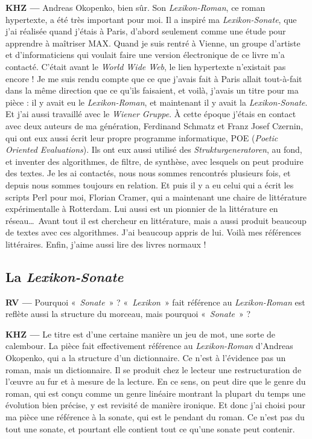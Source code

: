 \documentclass[a4paper,12pt]{article}
\newcommand{\guill}[1]{«~#1~»}
\begin{document}
\textbf{KHZ ---} Andreas Okopenko, bien sûr. Son \emph{Lexikon-Roman}, ce roman hypertexte, a été très important pour moi. Il a inspiré ma \emph{Lexikon-Sonate}, que j'ai réalisée quand j'étais à Paris, d'abord seulement comme une étude pour apprendre à maîtriser MAX. Quand je suis rentré à Vienne, un groupe d'artiste et d'informaticiens qui voulait faire une version électronique de ce livre m'a contacté. C'était avant le \emph{World Wide Web}, le lien hypertexte n'existait pas encore ! Je me suis rendu compte que ce que j'avais fait à Paris allait tout-à-fait dans la même direction que ce qu'ils faisaient, et voilà, j'avais un titre pour ma pièce : il y avait eu le \emph{Lexikon-Roman}, et maintenant il y avait la \emph{Lexikon-Sonate}. Et j'ai aussi travaillé avec le \emph{Wiener Gruppe}. À cette époque j'étais en contact avec deux auteurs de ma génération, Ferdinand Schmatz et Franz Josef Czernin, qui ont eux aussi écrit leur propre programme informatique, POE (\emph{Poetic Oriented Evaluations}). Ils ont eux aussi utilisé des \emph{Strukturgeneratoren}, au fond, et inventer des algorithmes, de filtre, de synthèse, avec lesquels on peut produire des textes. Je les ai contactés, nous nous sommes rencontrés plusieurs fois, et depuis nous sommes toujours en relation. Et puis il y a eu celui qui a écrit les scripts Perl pour moi, Florian Cramer, qui a maintenant une chaire de littérature expérimentalle à Rotterdam. Lui aussi est un pionnier de la littérature en réseau\dots~Avant tout il est chercheur en littérature, mais a aussi produit beaucoup de textes avec ces algorithmes. J'ai beaucoup appris de lui. Voilà mes références littéraires. Enfin, j'aime aussi lire des livres normaux !

\subsection{La \emph{Lexikon-Sonate}}

\textbf{RV ---} Pourquoi \guill{\emph{Sonate}} ? \guill{\emph{Lexikon}} fait référence au \emph{Lexikon-Roman} est reflète aussi la structure du morceau, mais pourquoi \guill{\emph{Sonate}} ?

\textbf{KHZ ---} Le titre est d'une certaine manière un jeu de mot, une sorte de calembour. La pièce fait effectivement référence au \emph{Lexikon-Roman} d'Andreas Okopenko, qui a la structure d'un dictionnaire. Ce n'est à l'évidence pas un roman, mais un dictionnaire. Il se produit chez le lecteur une restructuration de l'œuvre au fur et à mesure de la lecture. En ce sens, on peut dire que le genre du roman, qui est conçu comme un genre linéaire montrant la plupart du temps une évolution bien précise, y est revisité de manière ironique. Et donc j'ai choisi pour ma pièce une référence à la sonate, qui est le pendant du roman. Ce n'est pas du tout une sonate, et pourtant elle contient tout ce qu'une sonate peut contenir.
\end{document}

